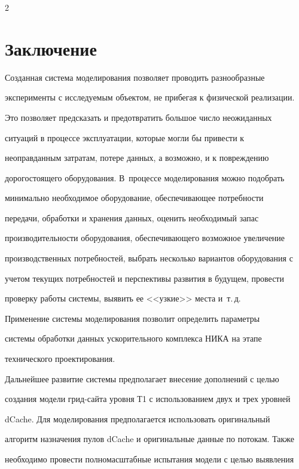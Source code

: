 \begin{multicols}{2}
\section{Заключение}





   Созданная система моделирования позволяет проводить разнообразные 


эксперименты с исследуемым объектом, не прибегая к физической реализации. 


Это позволяет предсказать и предотвратить большое число неожиданных 


ситуаций в процессе эксплуатации, которые могли бы при\-вес\-ти к 


неоправданным затратам, потере данных, а возможно, и к по\-вреж\-де\-нию 


дорогостоящего обору\-до\-ва\-ния. В~процессе моделирования можно подобрать 


минимально необходимое оборудование, обеспечивающее потребности 


передачи, обработки и хранения данных, оценить необходимый запас 


производительности оборудования, обеспе\-чи\-ва\-юще\-го возможное увеличение 


производственных потребностей, выбрать несколько вариантов оборудования с 


учетом текущих потребностей и перспективы развития в будущем, провести 


проверку работы сис\-те\-мы, выявить ее <<узкие>> места и~т.\,д.


   


   Применение системы моделирования позволит определить параметры 


системы обработки данных ускорительного комплекса НИКА на этапе 


технического проектирования. 


   


   Дальнейшее развитие системы предполагает внесение дополнений с целью 


создания модели грид-сай\-та уровня Т1 с использованием двух и трех уровней 


dCache. Для моделирования предполагается использовать оригинальный 


алгоритм назначения пулов dCache и оригинальные данные по потокам. Также 


необходимо провести полномасштабные испытания модели с целью выявления 



\end{multicols}
